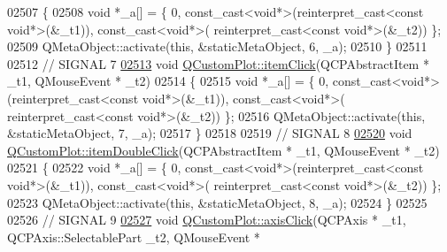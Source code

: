 \begin{DoxyCode}
02507 \{
02508     \textcolor{keywordtype}{void} *\_a[] = \{ 0, \textcolor{keyword}{const\_cast<}\textcolor{keywordtype}{void}*\textcolor{keyword}{>}(\textcolor{keyword}{reinterpret\_cast<}\textcolor{keyword}{const }\textcolor{keywordtype}{void}*\textcolor{keyword}{>}(&\_t1)), \textcolor{keyword}{const\_cast<}\textcolor{keywordtype}{void}*\textcolor{keyword}{>}(\textcolor{keyword}{
      reinterpret\_cast<}\textcolor{keyword}{const }\textcolor{keywordtype}{void}*\textcolor{keyword}{>}(&\_t2)) \};
02509     QMetaObject::activate(\textcolor{keyword}{this}, &staticMetaObject, 6, \_a);
02510 \}
02511 
02512 \textcolor{comment}{// SIGNAL 7}
\hypertarget{a00067_source_l02513}{}\hyperlink{a00116_ae16b51f52d2b7aebbc7e3e74e6ff2e4b}{02513} \textcolor{keywordtype}{void} \hyperlink{a00116_ae16b51f52d2b7aebbc7e3e74e6ff2e4b}{QCustomPlot::itemClick}(QCPAbstractItem * \_t1, QMouseEvent * \_t2)
02514 \{
02515     \textcolor{keywordtype}{void} *\_a[] = \{ 0, \textcolor{keyword}{const\_cast<}\textcolor{keywordtype}{void}*\textcolor{keyword}{>}(\textcolor{keyword}{reinterpret\_cast<}\textcolor{keyword}{const }\textcolor{keywordtype}{void}*\textcolor{keyword}{>}(&\_t1)), \textcolor{keyword}{const\_cast<}\textcolor{keywordtype}{void}*\textcolor{keyword}{>}(\textcolor{keyword}{
      reinterpret\_cast<}\textcolor{keyword}{const }\textcolor{keywordtype}{void}*\textcolor{keyword}{>}(&\_t2)) \};
02516     QMetaObject::activate(\textcolor{keyword}{this}, &staticMetaObject, 7, \_a);
02517 \}
02518 
02519 \textcolor{comment}{// SIGNAL 8}
\hypertarget{a00067_source_l02520}{}\hyperlink{a00116_ac83aa9f5a3e9bb3efc9cdc763dcd42a6}{02520} \textcolor{keywordtype}{void} \hyperlink{a00116_ac83aa9f5a3e9bb3efc9cdc763dcd42a6}{QCustomPlot::itemDoubleClick}(QCPAbstractItem * \_t1, QMouseEvent * \_t2)
02521 \{
02522     \textcolor{keywordtype}{void} *\_a[] = \{ 0, \textcolor{keyword}{const\_cast<}\textcolor{keywordtype}{void}*\textcolor{keyword}{>}(\textcolor{keyword}{reinterpret\_cast<}\textcolor{keyword}{const }\textcolor{keywordtype}{void}*\textcolor{keyword}{>}(&\_t1)), \textcolor{keyword}{const\_cast<}\textcolor{keywordtype}{void}*\textcolor{keyword}{>}(\textcolor{keyword}{
      reinterpret\_cast<}\textcolor{keyword}{const }\textcolor{keywordtype}{void}*\textcolor{keyword}{>}(&\_t2)) \};
02523     QMetaObject::activate(\textcolor{keyword}{this}, &staticMetaObject, 8, \_a);
02524 \}
02525 
02526 \textcolor{comment}{// SIGNAL 9}
\hypertarget{a00067_source_l02527}{}\hyperlink{a00116_abf635f8b56ab5c16d5de9f358543e82b}{02527} \textcolor{keywordtype}{void} \hyperlink{a00116_abf635f8b56ab5c16d5de9f358543e82b}{QCustomPlot::axisClick}(QCPAxis * \_t1, QCPAxis::SelectablePart \_t2, QMouseEvent *

\end{DoxyCode}
